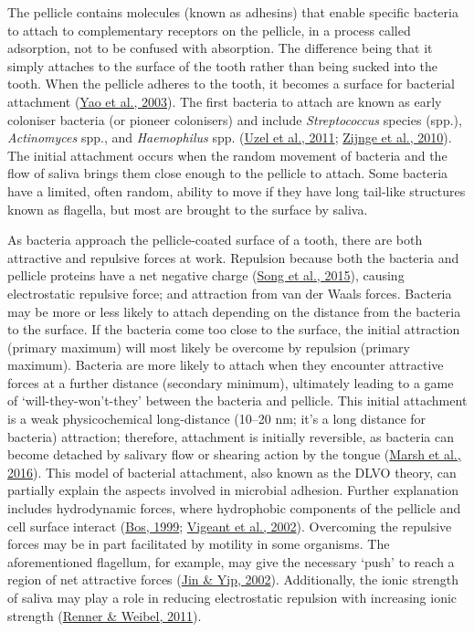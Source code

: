 \documentclass[
  b5paper,
]{book}
\begin{document}
The pellicle contains molecules (known as adhesins) that enable specific
bacteria to attach to complementary receptors on the pellicle, in a
process called adsorption, not to be confused with absorption. The
difference being that it simply attaches to the surface of the tooth
rather than being sucked into the tooth. When the pellicle adheres to
the tooth, it becomes a surface for bacterial attachment
(\protect\hyperlink{ref-yaoIdentificationProtein2003}{Yao et al.,
2003}). The first bacteria to attach are known as early coloniser
bacteria (or pioneer colonisers) and include \emph{Streptococcus}
species (spp.), \emph{Actinomyces} spp., and \emph{Haemophilus} spp.
(\protect\hyperlink{ref-uzelMicrobialShifts2011}{Uzel et al., 2011};
\protect\hyperlink{ref-zijngeBiofilmArchitecture2010}{Zijnge et al.,
2010}). The initial attachment occurs when the random movement of
bacteria and the flow of saliva brings them close enough to the pellicle
to attach. Some bacteria have a limited, often random, ability to move
if they have long tail-like structures known as flagella, but most are
brought to the surface by saliva.

As bacteria approach the pellicle-coated surface of a tooth, there are
both attractive and repulsive forces at work. Repulsion because both the
bacteria and pellicle proteins have a net negative charge
(\protect\hyperlink{ref-songEffectsMaterial2015}{Song et al., 2015}),
causing electrostatic repulsive force; and attraction from van der Waals
forces. Bacteria may be more or less likely to attach depending on the
distance from the bacteria to the surface. If the bacteria come too
close to the surface, the initial attraction (primary maximum) will most
likely be overcome by repulsion (primary maximum). Bacteria are more
likely to attach when they encounter attractive forces at a further
distance (secondary minimum), ultimately leading to a game of
`will-they-won't-they' between the bacteria and pellicle. This initial
attachment is a weak physicochemical long-distance (10--20 nm; it's a
long distance for bacteria) attraction; therefore, attachment is
initially reversible, as bacteria can become detached by salivary flow
or shearing action by the tongue
(\protect\hyperlink{ref-marshDentalPlaque2016}{Marsh et al., 2016}).
This model of bacterial attachment, also known as the DLVO theory, can
partially explain the aspects involved in microbial adhesion. Further
explanation includes hydrodynamic forces, where hydrophobic components
of the pellicle and cell surface interact
(\protect\hyperlink{ref-bosPhysicochemistryInitial1999}{Bos, 1999};
\protect\hyperlink{ref-vigeantReversibleIrreversible2002}{Vigeant et
al., 2002}). Overcoming the repulsive forces may be in part facilitated
by motility in some organisms. The aforementioned flagellum, for
example, may give the necessary `push' to reach a region of net
attractive forces
(\protect\hyperlink{ref-jinSupragingivalCalculus2002}{Jin \& Yip,
2002}). Additionally, the ionic strength of saliva may play a role in
reducing electrostatic repulsion with increasing ionic strength
(\protect\hyperlink{ref-rennerPhysicochemicalRegulation2011}{Renner \&
Weibel, 2011}).
\end{document}
